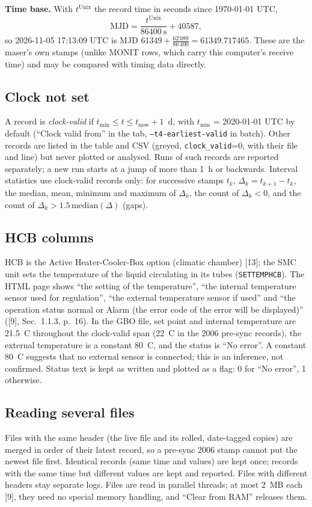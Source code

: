 \documentclass[11pt,a4paper]{article}
\newcommand{\tfournet}{[9]}
\begin{document}
\textbf{Time base.} With $t^{\mathrm{Unix}}$ the record time in seconds since 1970-01-01 UTC,
\[
\mathrm{MJD}=\frac{t^{\mathrm{Unix}}}{86400\ \mathrm{s}}+40587 ,
\]
so 2026-11-05 17:13:09 UTC is MJD $61349+\frac{62\,089}{86\,400}=61349.717465$. These are the
maser's own stamps (unlike MONIT rows, which carry this computer's receive time) and may be
compared with timing data directly.

\subsection{Clock not set}
A record is \emph{clock-valid} if $t_{\mathrm{min}}\le t\le t_{\mathrm{now}}+1$~d, with
$t_{\mathrm{min}}$ = 2020-01-01 UTC by default (``Clock valid from'' in the tab,
\texttt{--t4-earliest-valid} in batch). Other records are listed in the table and CSV (greyed,
\texttt{clock\_valid}=0, with their file and line) but never plotted or analysed. Runs of such
records are reported separately; a new run starts at a jump of more than 1~h or backwards. Interval
statistics use clock-valid records only: for successive stamps $t_k$,
$\Delta_k=t_{k+1}-t_k$, the median, mean, minimum and maximum of $\Delta_k$, the count of
$\Delta_k<0$, and the count of $\Delta_k>1.5\,\mathrm{median}(\Delta)$ (gaps).

\subsection{HCB columns}
HCB is the Active Heater-Cooler-Box option (climatic chamber) [13]; the SMC unit sets the
temperature of the liquid circulating in its tubes (\texttt{SETTEMPHCB}). The HTML page shows ``the
setting of the temperature'', ``the internal temperature sensor used for regulation'', ``the
external temperature sensor if used'' and ``the operation status normal or Alarm (the error code
of the error will be displayed)'' (\tfournet, Sec.~1.1.3, p.~16). In the GBO file, set point and
internal temperature are 21.5~\textdegree C throughout the clock-valid span (22~\textdegree C in the
2006 pre-sync records), the external temperature is a constant 80~\textdegree C, and the status is
``No error''. A constant 80~\textdegree C suggests that no external sensor is connected; this is an
inference, not confirmed. Status text is kept as written and plotted as a flag: 0 for ``No error'',
1 otherwise.

\subsection{Reading several files}
Files with the same header (the live file and its rolled, date-tagged copies) are merged in order of
their latest record, so a pre-sync 2006 stamp cannot put the newest file first. Identical records
(same time and values) are kept once; records with the same time but different values are kept and
reported. Files with different headers stay separate logs. Files are read in parallel threads; at
most 2~MB each \tfournet, they need no special memory handling, and ``Clear from RAM'' releases them.
\end{document}
